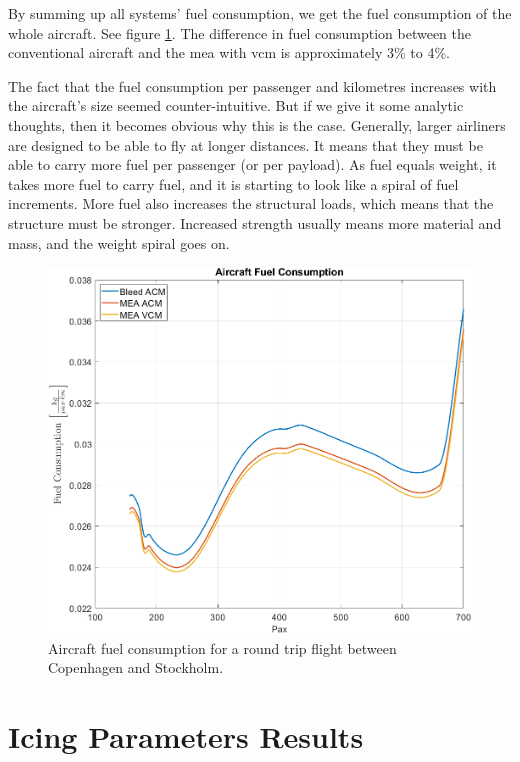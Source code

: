 \documentclass[english]{kththesis}
\begin{document}
\clearpage

By summing up all systems' fuel consumption, we get the fuel consumption of the whole aircraft. See figure \ref{fig:ACFuelCon}. The difference in fuel consumption between the conventional aircraft and the \acrshort{mea} with \acrshort{vcm} is approximately 3\% to 4\%.

The fact that the fuel consumption per passenger and kilometres increases with the aircraft's size seemed counter-intuitive. But if we give it some analytic thoughts, then it becomes obvious why this is the case. Generally, larger airliners are designed to be able to fly at longer distances. It means that they must be able to carry more fuel per passenger (or per payload). As fuel equals weight, it takes more fuel to carry fuel, and it is starting to look like a spiral of fuel increments. More fuel also increases the structural loads, which means that the structure must be stronger. Increased strength usually means more material and mass, and the weight spiral goes on.

\begin{figure}[!ht]
    \centering
    \includegraphics[width=1\textwidth]{Epictures/ACFuelCon.png}
    \caption{Aircraft fuel consumption for a round trip flight between Copenhagen and Stockholm.}
    \label{fig:ACFuelCon}
\end{figure}


\clearpage
\section{Icing Parameters Results}
\end{document}
